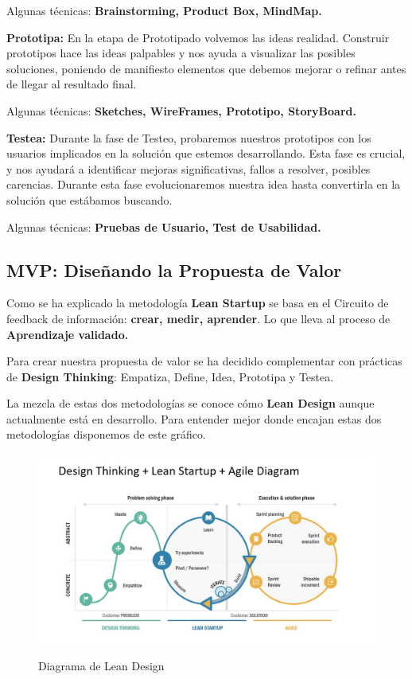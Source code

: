 \documentclass[12pt,twoside,titlepage]{report}
\begin{document}
Algunas técnicas: \textbf{Brainstorming, Product Box, MindMap.}

\textbf{Prototipa:} En la etapa de Prototipado volvemos las ideas realidad. Construir prototipos hace las ideas palpables y nos ayuda a visualizar las posibles soluciones, poniendo de manifiesto elementos que debemos mejorar o refinar antes de llegar al resultado final.

Algunas técnicas: \textbf{Sketches, WireFrames, Prototipo, StoryBoard.}

\textbf{Testea:} Durante la fase de Testeo, probaremos nuestros prototipos con los usuarios implicados en la solución que estemos desarrollando. Esta fase es crucial, y nos ayudará a identificar mejoras significativas, fallos a resolver, posibles carencias. Durante esta fase evolucionaremos nuestra idea hasta convertirla en la solución que estábamos buscando.

Algunas técnicas: \textbf{Pruebas de Usuario, Test de Usabilidad.}

\subsection{MVP: Diseñando la Propuesta de Valor}

Como se ha explicado la metodología \textbf{Lean Startup} se basa en el Circuito de feedback de información: \textbf{crear, medir, aprender}. Lo que lleva al proceso de \textbf{Aprendizaje validado.}

Para crear nuestra propuesta de valor se ha decidido complementar con prácticas de \textbf{Design Thinking}: Empatiza, Define, Idea, Prototipa y Testea.

La mezcla de estas dos metodologías se conoce cómo \textbf{Lean Design} aunque actualmente está en desarrollo. Para entender mejor donde encajan estas dos metodologías disponemos de este gráfico.

\begin{figure}[H] 
    \includegraphics[scale=0.3]{leandesignagile}
    \centering
    \label{fig:Lean Design Agile}
    \caption{Diagrama de Lean Design}
\end{figure}
\end{document}
